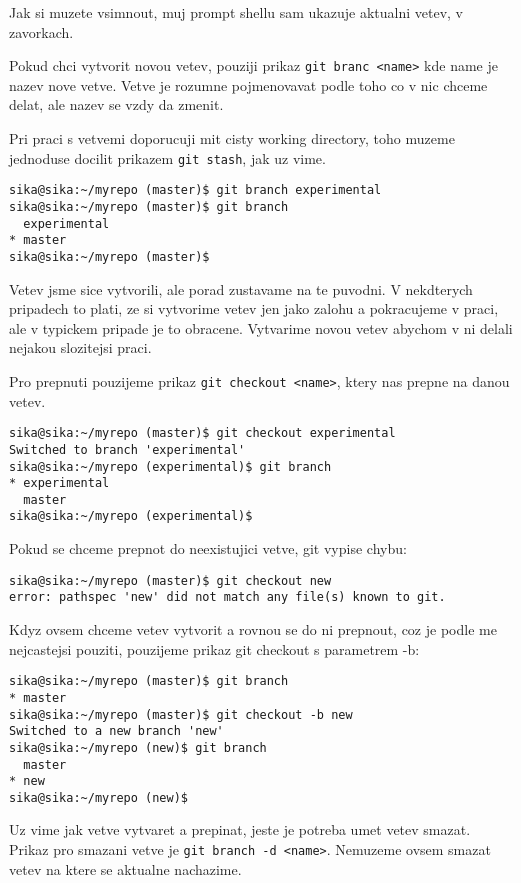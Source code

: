 \documentclass[12pt,a5paper]{article}
\begin{document}
Jak si muzete vsimnout, muj prompt shellu sam ukazuje aktualni vetev, v zavorkach.

Pokud chci vytvorit novou vetev, pouziji prikaz \lstinline|git branc <name>| kde name je nazev nove vetve. Vetve je rozumne pojmenovavat podle toho co v nic chceme delat, ale nazev se vzdy da zmenit.

Pri praci s vetvemi doporucuji mit cisty working directory, toho muzeme jednoduse docilit prikazem \lstinline|git stash|, jak uz vime.

\begin{lstlisting}
sika@sika:~/myrepo (master)$ git branch experimental
sika@sika:~/myrepo (master)$ git branch
  experimental
* master
sika@sika:~/myrepo (master)$
\end{lstlisting}

Vetev jsme sice vytvorili, ale porad zustavame na te puvodni. V nekdterych pripadech to plati, ze si vytvorime vetev jen jako zalohu a pokracujeme v praci, ale v typickem pripade je to obracene. Vytvarime novou vetev abychom v ni delali nejakou slozitejsi praci.

Pro prepnuti pouzijeme prikaz \lstinline|git checkout <name>|, ktery nas prepne na danou vetev.

\begin{lstlisting}
sika@sika:~/myrepo (master)$ git checkout experimental
Switched to branch 'experimental'
sika@sika:~/myrepo (experimental)$ git branch
* experimental
  master
sika@sika:~/myrepo (experimental)$
\end{lstlisting}

Pokud se chceme prepnot do neexistujici vetve, git vypise chybu:

\begin{lstlisting}
sika@sika:~/myrepo (master)$ git checkout new
error: pathspec 'new' did not match any file(s) known to git.
\end{lstlisting}

Kdyz ovsem chceme vetev vytvorit a rovnou se do ni prepnout, coz je podle me nejcastejsi pouziti, pouzijeme prikaz git checkout s parametrem -b:

\begin{lstlisting}
sika@sika:~/myrepo (master)$ git branch
* master
sika@sika:~/myrepo (master)$ git checkout -b new
Switched to a new branch 'new'
sika@sika:~/myrepo (new)$ git branch
  master
* new
sika@sika:~/myrepo (new)$
\end{lstlisting}

Uz vime jak vetve vytvaret a prepinat, jeste je potreba umet vetev smazat. Prikaz pro smazani vetve je \lstinline|git branch -d <name>|. Nemuzeme ovsem smazat vetev na ktere se aktualne nachazime.
\end{document}
